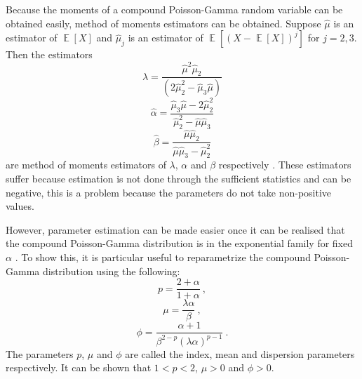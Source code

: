 \documentclass[12pt, a4paper]{memoir}
\DeclareMathOperator{\expectation}{\mathbb{E}}
\begin{document}
Because the moments of a compound Poisson-Gamma random variable can be obtained easily, method of moments estimators can be obtained. Suppose $\widehat{\mu}$ is an estimator of $\expectation[X]$ and $\widehat{\mu}_j$ is an estimator of $\expectation\left[\left(X-\expectation[X]\right)^j\right]$ for $j=2,3$. Then the estimators
\begin{equation}
	\widehat{\lambda}=\frac{\widehat{\mu}^2\widehat{\mu}_2}{\left(2\widehat{\mu}_2^2-\widehat{\mu}_3\widehat{\mu}\right)}
\end{equation}
\begin{equation}
	\widehat{\alpha}=\frac{\widehat{\mu}_3\widehat{\mu}-2\widehat{\mu}_2^2}{\widehat{\mu}_2^2-\widehat{\mu}\widehat{\mu}_3}
\end{equation}
\begin{equation}
	\widehat{\beta}=\frac{\widehat{\mu}\widehat{\mu}_2}{\widehat{\mu}\widehat{\mu}_3-\widehat{\mu}_2^2}
\end{equation}
are method of moments estimators of $\lambda$, $\alpha$ and $\beta$ respectively \citep{withers2011compound}. These estimators suffer because estimation is not done through the sufficient statistics and can be negative, this is a problem because the parameters do not take non-positive values.

However, parameter estimation can be made easier once it can be realised that the compound Poisson-Gamma distribution is in the exponential family for fixed $\alpha$ \citep{jorgensen1987exponential}. To show this, it is particular useful to reparametrize the compound Poisson-Gamma distribution using the following:
\begin{equation}
	p=\frac{2+\alpha}{1+\alpha}
	\ ,
\end{equation}
\begin{equation}
	\mu=\frac{\lambda\alpha}{\beta}
	\ ,
\end{equation}
\begin{equation}
	\phi = \frac{\alpha+1}{\beta^{2-p}(\lambda\alpha)^{p-1}}
	\ .
\end{equation}
The parameters $p$, $\mu$ and $\phi$ are called the index, mean and dispersion parameters respectively. It can be shown that $1<p<2$, $\mu>0$ and $\phi>0$.
\end{document}
